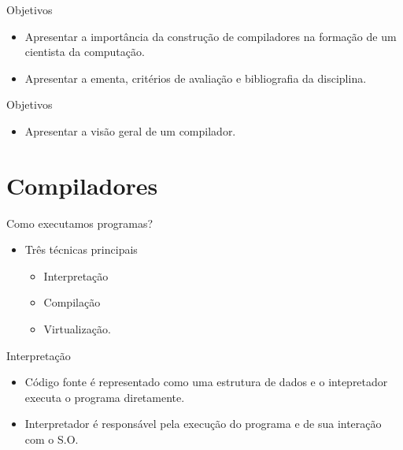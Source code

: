 \subtitle{\bf Apresentação}
\begin{frame}[t,plain]
    \titlepage
\end{frame}

\begin{frame}{Objetivos}

    \begin{itemize}

        \item
        Apresentar a importância da construção de compiladores na formação de
        um cientista da computação.
        \item
        Apresentar a ementa, critérios de avaliação e bibliografia da
        disciplina.
    \end{itemize}
\end{frame}

\begin{frame}{Objetivos}

    \begin{itemize}

        \item
        Apresentar a visão geral de um compilador.
    \end{itemize}
\end{frame}


\section{Compiladores}\label{compiladores}

\begin{frame}{Como executamos programas?}

    \begin{itemize}

        \item
        Três técnicas principais

        \begin{itemize}

            \item
            Interpretação
            \item
            Compilação
            \item
            Virtualização.
        \end{itemize}
    \end{itemize}
\end{frame}

\begin{frame}{Interpretação}

    \begin{itemize}

        \item
        Código fonte é representado como uma estrutura de dados e o
        intepretador executa o programa diretamente.
        \item
        Interpretador é responsável pela execução do programa e de sua
        interação com o S.O.
    \end{itemize}
\end{frame}

